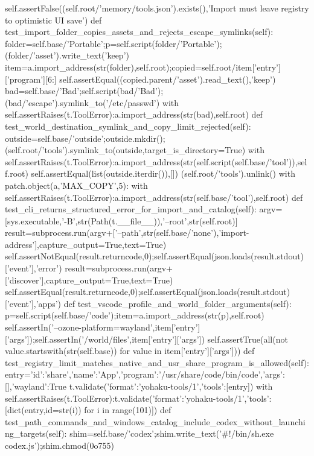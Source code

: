         self.assertFalse((self.root/'memory/tools.json').exists(),'Import must leave registry to optimistic UI save')
    def test_import_folder_copies_assets_and_rejects_escape_symlinks(self):
        folder=self.base/'Portable';p=self.script(folder/'Portable');(folder/'asset').write_text('keep')
        item=a.import_address(str(folder),self.root);copied=self.root/item['entry']['program'][6:]
        self.assertEqual((copied.parent/'asset').read_text(),'keep')
        bad=self.base/'Bad';self.script(bad/'Bad');(bad/'escape').symlink_to('/etc/passwd')
        with self.assertRaises(t.ToolError):a.import_address(str(bad),self.root)
    def test_world_destination_symlink_and_copy_limit_rejected(self):
        outside=self.base/'outside';outside.mkdir();(self.root/'tools').symlink_to(outside,target_is_directory=True)
        with self.assertRaises(t.ToolError):a.import_address(str(self.script(self.base/'tool')),self.root)
        self.assertEqual(list(outside.iterdir()),[])
        (self.root/'tools').unlink()
        with patch.object(a,'MAX_COPY',5):
            with self.assertRaises(t.ToolError):a.import_address(str(self.base/'tool'),self.root)
    def test_cli_returns_structured_error_for_import_and_catalog(self):
        argv=[sys.executable,'-B',str(Path(t.__file__)),'--root',str(self.root)]
        result=subprocess.run(argv+['--path',str(self.base/'none'),'import-address'],capture_output=True,text=True)
        self.assertNotEqual(result.returncode,0);self.assertEqual(json.loads(result.stdout)['event'],'error')
        result=subprocess.run(argv+['discover'],capture_output=True,text=True)
        self.assertEqual(result.returncode,0);self.assertEqual(json.loads(result.stdout)['event'],'apps')
    def test_vscode_profile_and_world_folder_arguments(self):
        p=self.script(self.base/'code');item=a.import_address(str(p),self.root)
        self.assertIn('--ozone-platform=wayland',item['entry']['args']);self.assertIn('/world/files',item['entry']['args'])
        self.assertTrue(all(not value.startswith(str(self.base)) for value in item['entry']['args']))
    def test_registry_limit_matches_native_and_usr_share_program_is_allowed(self):
        entry={'id':'share','name':'App','program':'/usr/share/code/bin/code','args':[],'wayland':True}
        t.validate({'format':'yohaku-tools/1','tools':[entry]})
        with self.assertRaises(t.ToolError):t.validate({'format':'yohaku-tools/1','tools':[dict(entry,id=str(i)) for i in range(101)]})
    def test_path_commands_and_windows_catalog_include_codex_without_launching_targets(self):
        shim=self.base/'codex';shim.write_text('#!/bin/sh\nnode.exe codex.js\n');shim.chmod(0o755)

